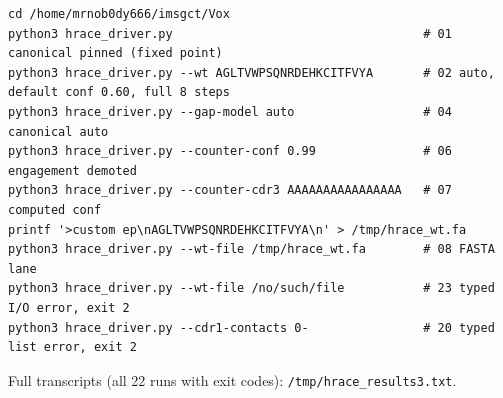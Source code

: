 \documentclass[12pt,a4paper]{article}
\begin{document}
\begin{verbatim}
cd /home/mrnob0dy666/imsgct/Vox
python3 hrace_driver.py                                   # 01 canonical pinned (fixed point)
python3 hrace_driver.py --wt AGLTVWPSQNRDEHKCITFVYA       # 02 auto, default conf 0.60, full 8 steps
python3 hrace_driver.py --gap-model auto                  # 04 canonical auto
python3 hrace_driver.py --counter-conf 0.99               # 06 engagement demoted
python3 hrace_driver.py --counter-cdr3 AAAAAAAAAAAAAAAA   # 07 computed conf
printf '>custom ep\nAGLTVWPSQNRDEHKCITFVYA\n' > /tmp/hrace_wt.fa
python3 hrace_driver.py --wt-file /tmp/hrace_wt.fa        # 08 FASTA lane
python3 hrace_driver.py --wt-file /no/such/file           # 23 typed I/O error, exit 2
python3 hrace_driver.py --cdr1-contacts 0-                # 20 typed list error, exit 2
\end{verbatim}

Full transcripts (all 22 runs with exit codes):
\texttt{/tmp/hrace\_results3.txt}.
\end{document}
